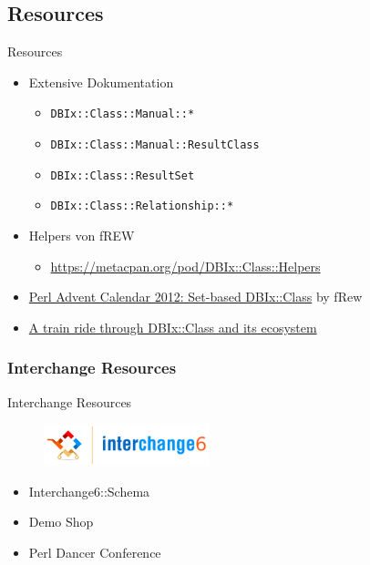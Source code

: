 \subsection{Resources}
\begin{frame}[fragile]{Resources}
\begin{itemize}
\item Extensive Dokumentation
\begin{itemize}
\item \verb|DBIx::Class::Manual::*|
\item \verb|DBIx::Class::Manual::ResultClass|
\item \verb|DBIx::Class::ResultSet|
\item \verb|DBIx::Class::Relationship::*|
\end{itemize}
\item Helpers von fREW
\begin{itemize}
\item \href{https://metacpan.org/pod/DBIx::Class::Helpers}{https://metacpan.org/pod/DBIx::Class::Helpers}
\end{itemize}
\item \href{http://www.perladvent.org/2012/2012-12-21.html}
{Perl Advent Calendar 2012: Set-based DBIx::Class}
by fRew
\item \href{https://wiki.linuxia.de/library/stefan-hornburg-racke-a-train-ride-through-dbix-class-and-its-ecosystem-en}{A train ride through DBIx::Class and its ecosystem} 
\end{itemize}


\end{frame}

\subsubsection{Interchange Resources}

\begin{frame}{Interchange Resources}
\begin{figure}[!ht]
\centering
\includegraphics[width=0.4\linewidth]{img/interchange6-logo-v2.png}
\end{figure}
\begin{itemize}
\item Interchange6::Schema
\item Demo Shop
\item Perl Dancer Conference
\end{itemize}
\end{frame}


